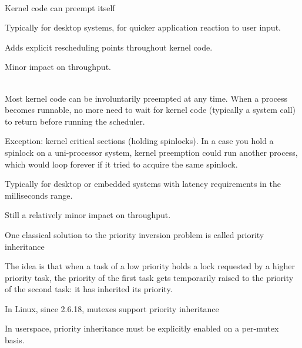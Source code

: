   \\
  Kernel code can preempt itself
  \startitemize
  \item Typically for desktop systems, for quicker application
    reaction to user input.
  \item Adds explicit rescheduling points throughout kernel code.
  \item Minor impact on throughput.
  \stopitemize

  \\
  Most kernel code can be involuntarily preempted at any time.  When a
  process becomes runnable, no more need to wait for kernel code
  (typically a system call) to return before running the scheduler.
  \startitemize
  \item Exception: kernel critical sections (holding spinlocks).
    In a case you hold a spinlock on a uni-processor system, kernel preemption
    could run another process, which would loop forever if it
    tried to acquire the same spinlock.
  \item Typically for desktop or embedded systems with latency
    requirements in the milliseconds range.
  \item Still a relatively minor impact on throughput.
  \stopitemize

  \startitemize
  \item One classical solution to the priority inversion problem is
    called priority inheritance
    \startitemize
    \item The idea is that when a task of a low priority holds a lock
      requested by a higher priority task, the priority of the first
      task gets temporarily raised to the priority of the second task:
      it has inherited its priority.
    \stopitemize
  \item In Linux, since 2.6.18, mutexes support priority inheritance
  \item In userspace, priority inheritance must be explicitly enabled
    on a per-mutex basis.
  \stopitemize

